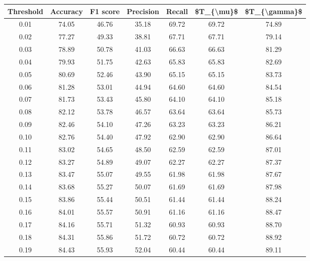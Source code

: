 \begin{tabular}{|c|c|c|c|c|c|c|}
\toprule
 Threshold &  Accuracy &  F1 score &  Precision &  Recall &  \$T\_\{\textbackslash mu\}\$ &  \$T\_\{\textbackslash gamma\}\$ \\
\hline
      0.01 &     74.05 &     46.76 &      35.18 &   69.72 &      69.72 &         74.89 \\
      0.02 &     77.27 &     49.33 &      38.81 &   67.71 &      67.71 &         79.14 \\
      0.03 &     78.89 &     50.78 &      41.03 &   66.63 &      66.63 &         81.29 \\
      0.04 &     79.93 &     51.75 &      42.63 &   65.83 &      65.83 &         82.69 \\
      0.05 &     80.69 &     52.46 &      43.90 &   65.15 &      65.15 &         83.73 \\
      0.06 &     81.28 &     53.01 &      44.94 &   64.60 &      64.60 &         84.54 \\
      0.07 &     81.73 &     53.43 &      45.80 &   64.10 &      64.10 &         85.18 \\
      0.08 &     82.12 &     53.78 &      46.57 &   63.64 &      63.64 &         85.73 \\
      0.09 &     82.46 &     54.10 &      47.26 &   63.23 &      63.23 &         86.21 \\
      0.10 &     82.76 &     54.40 &      47.92 &   62.90 &      62.90 &         86.64 \\
      0.11 &     83.02 &     54.65 &      48.50 &   62.59 &      62.59 &         87.01 \\
      0.12 &     83.27 &     54.89 &      49.07 &   62.27 &      62.27 &         87.37 \\
      0.13 &     83.47 &     55.07 &      49.55 &   61.98 &      61.98 &         87.67 \\
      0.14 &     83.68 &     55.27 &      50.07 &   61.69 &      61.69 &         87.98 \\
      0.15 &     83.86 &     55.44 &      50.51 &   61.44 &      61.44 &         88.24 \\
      0.16 &     84.01 &     55.57 &      50.91 &   61.16 &      61.16 &         88.47 \\
      0.17 &     84.16 &     55.71 &      51.32 &   60.93 &      60.93 &         88.70 \\
      0.18 &     84.31 &     55.86 &      51.72 &   60.72 &      60.72 &         88.92 \\
      0.19 &     84.43 &     55.93 &      52.04 &   60.44 &      60.44 &         89.11 \\

\end{tabular}

